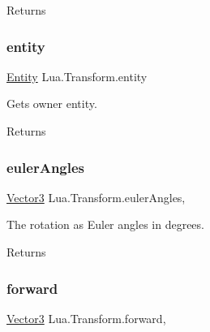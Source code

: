 \begin{DoxyReturn}{Returns}

\end{DoxyReturn}
\mbox{\label{class_lua_1_1_transform_a1a4480b448b89a7e1f392af4c842cc28}} 
\subsubsection{\texorpdfstring{entity}{entity}}
{\footnotesize\ttfamily \mbox{\hyperlink{class_lua_1_1_entity}{Entity}} Lua.\+Transform.\+entity\hspace{0.3cm}{\ttfamily [get]}}



Gets owner entity. 

\begin{DoxyReturn}{Returns}

\end{DoxyReturn}
\mbox{\label{class_lua_1_1_transform_ad9a5f0534a08dc2d6cb9ad32b6581b8d}} 
\subsubsection{\texorpdfstring{eulerAngles}{eulerAngles}}
{\footnotesize\ttfamily \mbox{\hyperlink{class_lua_1_1_vector3}{Vector3}} Lua.\+Transform.\+euler\+Angles\hspace{0.3cm}{\ttfamily [get]}, {\ttfamily [set]}}



The rotation as Euler angles in degrees. 

\begin{DoxyReturn}{Returns}

\end{DoxyReturn}
\mbox{\label{class_lua_1_1_transform_ad07cf6c2802bfbab50272030379f1826}} 
\subsubsection{\texorpdfstring{forward}{forward}}
{\footnotesize\ttfamily \mbox{\hyperlink{class_lua_1_1_vector3}{Vector3}} Lua.\+Transform.\+forward\hspace{0.3cm}{\ttfamily [get]}, {\ttfamily [set]}}



